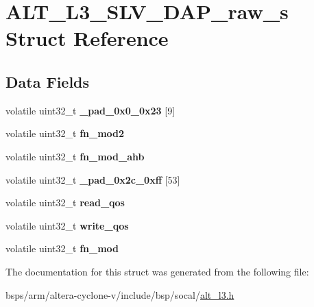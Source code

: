 \hypertarget{structALT__L3__SLV__DAP__raw__s}{}\section{A\+L\+T\+\_\+\+L3\+\_\+\+S\+L\+V\+\_\+\+D\+A\+P\+\_\+raw\+\_\+s Struct Reference}
\label{structALT__L3__SLV__DAP__raw__s}
\subsection*{Data Fields}
\begin{DoxyCompactItemize}
\item 
\mbox{\label{structALT__L3__SLV__DAP__raw__s_a851b3ee7cda9c1a4f191108dd7e0809f}} 
volatile uint32\+\_\+t {\bfseries \+\_\+pad\+\_\+0x0\+\_\+0x23} \mbox{[}9\mbox{]}
\item 
\mbox{\label{structALT__L3__SLV__DAP__raw__s_ae3a3e5121e7c3123e882fe86c6b9414a}} 
volatile uint32\+\_\+t {\bfseries fn\+\_\+mod2}
\item 
\mbox{\label{structALT__L3__SLV__DAP__raw__s_ab2588fd9611716d001c7e99366f12eef}} 
volatile uint32\+\_\+t {\bfseries fn\+\_\+mod\+\_\+ahb}
\item 
\mbox{\label{structALT__L3__SLV__DAP__raw__s_a860abc806ad7e828cf6dc61675699c84}} 
volatile uint32\+\_\+t {\bfseries \+\_\+pad\+\_\+0x2c\+\_\+0xff} \mbox{[}53\mbox{]}
\item 
\mbox{\label{structALT__L3__SLV__DAP__raw__s_ac287a9b7b59a9676def6543d4197ca12}} 
volatile uint32\+\_\+t {\bfseries read\+\_\+qos}
\item 
\mbox{\label{structALT__L3__SLV__DAP__raw__s_aa3369378d56ea00ed3eca4e05bb17bfd}} 
volatile uint32\+\_\+t {\bfseries write\+\_\+qos}
\item 
\mbox{\label{structALT__L3__SLV__DAP__raw__s_a62a2c1df5c0a35f091e1fd5f4e76fd01}} 
volatile uint32\+\_\+t {\bfseries fn\+\_\+mod}
\end{DoxyCompactItemize}


The documentation for this struct was generated from the following file\+:\begin{DoxyCompactItemize}
\item 
bsps/arm/altera-\/cyclone-\/v/include/bsp/socal/\mbox{\hyperlink{alt__l3_8h}{alt\+\_\+l3.\+h}}\end{DoxyCompactItemize}
